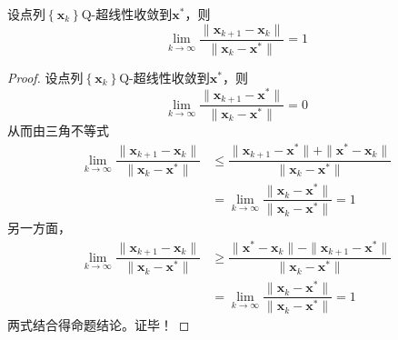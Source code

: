 \begin{example}
    设点列$\left\{ \boldsymbol{x}_k \right\}$Q-超线性收敛到$\boldsymbol{x}^*$，则
    \[
        \lim\limits_{k\to \infty}\dfrac{\| \boldsymbol{x}_{k+1}-\boldsymbol{x}_{k} \|}{\|\boldsymbol{x}_{k}-\boldsymbol{x}^{*}\|} = 1
    \]
    \begin{proof}
        设点列$\left\{ \boldsymbol{x}_k \right\}$Q-超线性收敛到$\boldsymbol{x}^*$，则
        \[
            \lim\limits_{k\to \infty}\dfrac{\| \boldsymbol{x}_{k+1}-\boldsymbol{x}^{*} \|}{\|\boldsymbol{x}_{k}-\boldsymbol{x}^{*}\|} = 0
        \]
        从而由三角不等式
        \[
            \begin{array}{ll}
                \lim\limits_{k\to \infty}\dfrac{\| \boldsymbol{x}_{k+1}-\boldsymbol{x}_{k} \|}{\| \boldsymbol{x}_{k}-\boldsymbol{x}^* \|}&\leqslant \dfrac{\| \boldsymbol{x}_{k+1}-\boldsymbol{x}^*\| + \| \boldsymbol{x}^*-\boldsymbol{x}_{k}  \|}{\| \boldsymbol{x}_{k}-\boldsymbol{x}^* \|}\\
                &=\lim\limits_{k\to \infty}\dfrac{\| \boldsymbol{x}_k-\boldsymbol{x}^* \|}{\| \boldsymbol{x}_k-\boldsymbol{x}^* \|} = 1
            \end{array}
        \]
        另一方面，
        \[
            \begin{array}{ll}
                \lim\limits_{k\to \infty}\dfrac{\| \boldsymbol{x}_{k+1}-\boldsymbol{x}_{k} \|}{\| \boldsymbol{x}_{k}-\boldsymbol{x}^* \|}&\geqslant \dfrac{\| \boldsymbol{x}^*-\boldsymbol{x}_{k}\| - \| \boldsymbol{x}_{k+1}-\boldsymbol{x}^*\|}{\| \boldsymbol{x}_{k}-\boldsymbol{x}^* \|}\\
                &=\lim\limits_{k\to \infty}\dfrac{\| \boldsymbol{x}_k-\boldsymbol{x}^* \|}{\| \boldsymbol{x}_k-\boldsymbol{x}^* \|} = 1
            \end{array}
        \]
        两式结合得命题结论。证毕！
    \end{proof}
\end{example}

